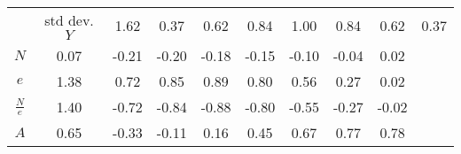 \begin{tabular}{ccccccccc}
\toprule
 & std dev. %
\midrule
$Y$ & 1.62 & 0.37 & 0.62 & 0.84 & 1.00 & 0.84 & 0.62 & 0.37 \\
$N$ & 0.07 & -0.21 & -0.20 & -0.18 & -0.15 & -0.10 & -0.04 & 0.02 \\
$e$ & 1.38 & 0.72 & 0.85 & 0.89 & 0.80 & 0.56 & 0.27 & 0.02 \\
$\frac{N}{e}$ & 1.40 & -0.72 & -0.84 & -0.88 & -0.80 & -0.55 & -0.27 & -0.02 \\
$A$ & 0.65 & -0.33 & -0.11 & 0.16 & 0.45 & 0.67 & 0.77 & 0.78 \\
\bottomrule
\end{tabular}
